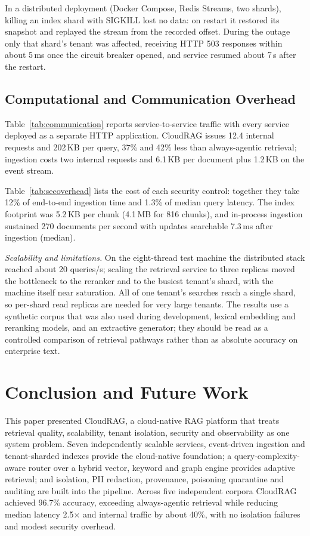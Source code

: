 \documentclass[journal]{IEEEtran}
\begin{document}


In a distributed deployment (Docker Compose, Redis Streams, two shards), killing an index shard with
SIGKILL lost no data: on restart it restored its snapshot and replayed the stream from the recorded
offset. During the outage only that shard's tenant was affected, receiving HTTP 503 responses within
about 5\,ms once the circuit breaker opened, and service resumed about 7\,s after the restart.

\subsection{Computational and Communication Overhead}
Table~\ref{tab:communication} reports service-to-service traffic with every service deployed as a separate
HTTP application. CloudRAG issues 12.4 internal requests and 202\,KB per query, 37\% and 42\% less than
always-agentic retrieval; ingestion costs two internal requests and 6.1\,KB per document plus 1.2\,KB on
the event stream.



Table~\ref{tab:secoverhead} lists the cost of each security control: together they take 12\% of
end-to-end ingestion time and 1.3\% of median query latency. The index footprint was 5.2\,KB per chunk
(4.1\,MB for 816 chunks), and in-process ingestion sustained 270 documents per second with updates
searchable 7.3\,ms after ingestion (median).



\textit{Scalability and limitations.} On the eight-thread test machine the distributed stack reached about
20 queries/s; scaling the retrieval service to three replicas moved the bottleneck to the reranker and to
the busiest tenant's shard, with the machine itself near saturation. All of one tenant's searches reach a
single shard, so per-shard read replicas are needed for very large tenants. The results use a synthetic
corpus that was also used during development, lexical embedding and reranking models, and an extractive
generator; they should be read as a controlled comparison of retrieval pathways rather than as absolute
accuracy on enterprise text.

\section{Conclusion and Future Work}
This paper presented CloudRAG, a cloud-native RAG platform that treats retrieval quality, scalability,
tenant isolation, security and observability as one system problem. Seven independently scalable services,
event-driven ingestion and tenant-sharded indexes provide the cloud-native foundation; a
query-complexity-aware router over a hybrid vector, keyword and graph engine provides adaptive retrieval;
and isolation, PII redaction, provenance, poisoning quarantine and auditing are built into the pipeline.
Across five independent corpora CloudRAG achieved 96.7\% accuracy, exceeding always-agentic retrieval while
reducing median latency 2.5$\times$ and internal traffic by about 40\%, with no isolation failures and
modest security overhead.
\end{document}
